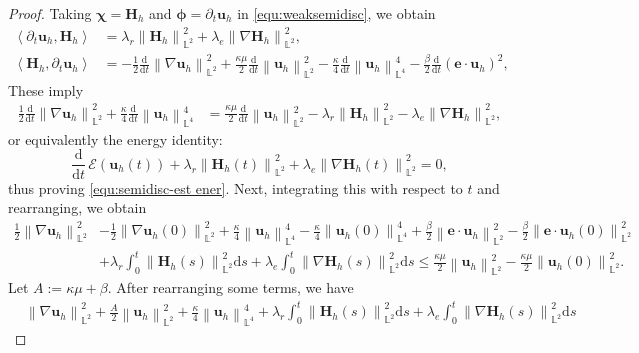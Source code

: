 \documentclass[11pt, reqno]{amsart}
\theoremstyle{definition}
\theoremstyle{remark}
\numberwithin{equation}{section}
\newcommand{\cal}{\mathcal}
\newcommand{\bff}{\boldsymbol}
\newcommand{\bb}{\mathbb}
\newcommand{\ddt}{\frac{\mathrm{d}}{\mathrm{d}t}}
\newcommand{\ds}{\mathrm{d}s}
\newcommand{\norm}[2]{\left\|{#1}\right\|_{#2}}
\newcommand{\inpro}[2]{\left\langle#1,#2\right\rangle}
\begin{document}
\begin{proof}
Taking $\bff{\chi} = \bff{H}_h$ and $\bff{\phi}= \partial_t \bff{u}_h$ in \eqref{equ:weaksemidisc}, we obtain
\begin{align*}
	\inpro{\partial_t \bff{u}_h}{\bff{H}_h}
	&=
	\lambda_r \norm{\bff{H}_h}{\bb{L}^2}^2
	+
	\lambda_e \norm{\nabla \bff{H}_h}{\bb{L}^2}^2,
	\\
	\inpro{\bff{H}_h}{\partial_t \bff{u}_h}
	&=
	-
	\frac{1}{2} \ddt \norm{\nabla \bff{u}_h}{\bb{L}^2}^2
	+
	\frac{\kappa \mu}{2} \ddt \norm{\bff{u}_h}{\bb{L}^2}^2
	-
	\frac{\kappa}{4} \ddt \norm{\bff{u}_h}{\bb{L}^4}^4
	-
	\frac{\beta}{2} \ddt (\bff{e}\cdot \bff{u}_h)^2,
\end{align*}
These imply
\begin{align*}
	\frac{1}{2} \ddt \norm{\nabla \bff{u}_h}{\bb{L}^2}^2
	+
	\frac{\kappa}{4} \ddt \norm{\bff{u}_h}{\bb{L}^4}^4
	&=
	\frac{\kappa\mu}{2} \ddt \norm{\bff{u}_h}{\bb{L}^2}^2
	-
	\lambda_r \norm{\bff{H}_h}{\bb{L}^2}^2
	-
	\lambda_e \norm{\nabla \bff{H}_h}{\bb{L}^2}^2,
\end{align*}
or equivalently the energy identity:
\begin{equation*}
	\ddt\, \cal{E}(\bff{u}_h(t)) + \lambda_r \norm{\bff{H}_h(t)}{\bb{L}^2}^2 + \lambda_e \norm{\nabla \bff{H}_h(t)}{\bb{L}^2}^2 = 0,
\end{equation*}
thus proving \eqref{equ:semidisc-est ener}. Next, integrating this with respect to $t$ and rearranging, we obtain
\begin{align}\label{equ:nab uh eq}
	\frac{1}{2} \norm{\nabla \bff{u}_h}{\bb{L}^2}^2
	&-
	\frac{1}{2}\norm{\nabla \bff{u}_h(0)}{\bb{L}^2}^2
	+
	\frac{\kappa}{4} \norm{\bff{u}_h}{\bb{L}^4}^4
	-
	\frac{\kappa}{4} \norm{\bff{u}_h(0)}{\bb{L}^4}^4
	+
	\frac{\beta}{2} \norm{\bff{e}\cdot \bff{u}_h}{\bb{L}^2}^2
	-
	\frac{\beta}{2} \norm{\bff{e}\cdot \bff{u}_h(0)}{\bb{L}^2}^2
	\nonumber \\
	&+ \lambda_r \int_0^t \norm{\bff{H}_h(s)}{\bb{L}^2}^2 \ds
	+ \lambda_e \int_0^t \norm{\nabla \bff{H}_h(s)}{\bb{L}^2}^2 \ds
	\leq
	\frac{\kappa\mu}{2} \norm{\bff{u}_h}{\bb{L}^2}^2
	-
	\frac{\kappa\mu}{2} \norm{\bff{u}_h(0)}{\bb{L}^2}^2.
\end{align}
Let $A:=\kappa\mu+\beta$. After rearranging some terms, we have
\begin{align}\label{equ:norm uh L4}
	\nonumber
	&\norm{\nabla \bff{u}_h}{\bb{L}^2}^2
	+
	\frac{A}{2} \norm{\bff{u}_h}{\bb{L}^2}^2
	+
	\frac{\kappa}{4} \norm{\bff{u}_h}{\bb{L}^4}^4
	+ \lambda_r \int_0^t \norm{\bff{H}_h(s)}{\bb{L}^2}^2 \ds
	+ \lambda_e \int_0^t \norm{\nabla \bff{H}_h(s)}{\bb{L}^2}^2 \ds

\end{align}
\end{proof}
\end{document}
